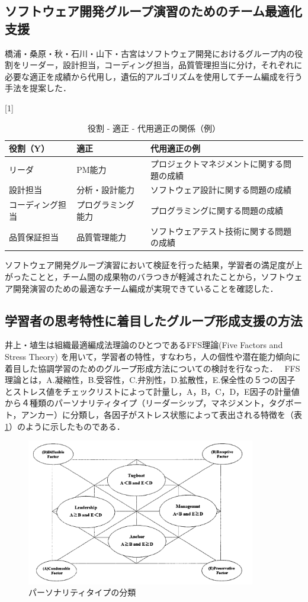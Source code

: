 \documentclass{funthesis}
\begin{document}
\subsection{ソフトウェア開発グループ演習のためのチーム最適化支援}
橋浦・桑原・秋・石川・山下・古宮\cite{A6}はソフトウェア開発におけるグループ内の役割をリーダー，設計担当，コーディング担当，品質管理担当に分け，それぞれに必要な適正を成績から代用し，遺伝的アルゴリズムを使用してチーム編成を行う手法を提案した．
\begin{table}[H]
\begin{center}
  \caption{役割 - 適正 - 代用適正の関係（例）}
  \scalebox{0.9}[1]{
  \begin{tabular}{lll} \hline
    役割（Y） & 適正 & 代用適正の例\tabularnewline \hline
    リーダ & PM能力 & プロジェクトマネジメントに関する問題の成績\tabularnewline
    設計担当 &分析・設計能力 & 
    ソフトウェア設計に関する問題の成績\tabularnewline
    コーディング担当&プログラミング能力 &
    プログラミングに関する問題の成績\tabularnewline
    品質保証担当&品質管理能力 &
    ソフトウェアテスト技術に関する問題の成績\tabularnewline
    \hline
  \end{tabular}
}
  \label{適正}
  \end{center}
\end{table}
ソフトウェア開発グループ演習において検証を行った結果，学習者の満足度が上がったことと，チーム間の成果物のバラつきが軽減されたことから，ソフトウェア開発演習のための最適なチーム編成が実現できていることを確認した．


\subsection{学習者の思考特性に着目したグループ形成支援の方法}
井上・埴生は\cite{A7}組織最適編成法理論のひとつであるFFS理論(Five Factors and Stress Theory)
\cite{A8}を用いて，学習者の特性，すなわち，人の個性や潜在能力傾向に着目した協調学習のためのグループ形成方法についての検討を行なった．
\ FFS理論とは，A.凝縮性，B.受容性，C.弁別性，D.拡散性，E.保全性の５つの因子とストレス値をチェックリストによって計量し，A，B，C，D，E因子の計量値から４種類のパーソナリティタイプ（リーダーシップ，マネジメント，タグボート，アンカー）に分類し，各因子がストレス状態によって表出される特徴を（表\ref{FFS}）のように示したものである\cite{A9}．
\begin{figure}[H]
 \centering
   \includegraphics[width=100mm]{figures/FFS.png}
 \caption{パーソナリティタイプの分類}
 \label{FFS}
\end{figure}
\end{document}
